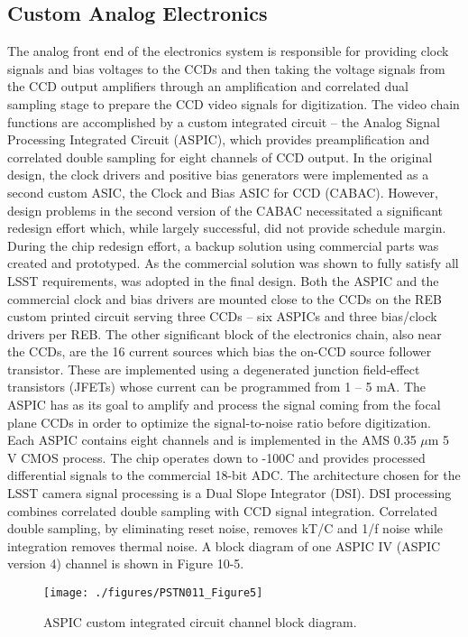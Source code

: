 \subsection{Custom Analog Electronics}
The analog front end of the electronics system is responsible for providing clock signals and bias voltages to the CCDs and then taking the voltage signals from the CCD output amplifiers through an amplification and correlated dual sampling stage to prepare the CCD video signals for digitization. The video chain functions are accomplished by a custom integrated circuit – the Analog Signal Processing Integrated Circuit (ASPIC), which provides preamplification and correlated double sampling for eight channels of CCD output.
In the original design, the clock drivers and positive bias generators were implemented as a second custom ASIC, the Clock and Bias ASIC for CCD (CABAC). However, design problems in the second version of the CABAC necessitated a significant redesign effort which, while largely successful, did not provide schedule margin. During the chip redesign effort, a backup solution using commercial parts was created and prototyped. As the commercial solution was shown to fully satisfy all LSST requirements, was adopted in the final design. 
Both the ASPIC and the commercial clock and bias drivers are mounted close to the CCDs on the REB custom printed circuit serving three CCDs – six ASPICs and three bias/clock drivers per REB. The other significant block of the electronics chain, also near the CCDs,  are the 16 current sources which bias the on-CCD source follower transistor. These are implemented using a degenerated junction field-effect transistors (JFETs) whose current can be programmed from 1 – 5 mA. The ASPIC has as its goal to amplify and process the signal coming from the focal plane CCDs in order to optimize the signal-to-noise ratio before digitization. 
Each ASPIC contains eight channels and is implemented in the AMS 0.35 $\mu$m 5 V CMOS process. The chip operates down to -100C and provides processed differential signals to the commercial 18-bit ADC.
The architecture chosen for the LSST camera signal processing is a Dual Slope Integrator (DSI). DSI processing combines correlated double sampling with CCD signal integration. Correlated double sampling, by eliminating reset noise, removes kT/C and 1/f noise while integration removes thermal noise. A block diagram of one ASPIC IV (ASPIC version 4) channel is shown in Figure 10-5. 

 \begin{figure}[htbp]
\begin{center}
\texttt{[image: ./figures/PSTN011\_Figure5]}
\caption{ASPIC custom integrated circuit channel block diagram.}
\label{fig:Fig5}
\end{center}
\end{figure}

